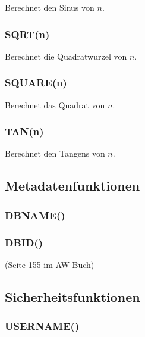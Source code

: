 \documentclass[12pt,ngerman,a4paper,index=totoc,twoside]{scrartcl}
\begin{document}
Berechnet den Sinus von $n$.

\subsubsection{SQRT(n)}

Berechnet die Quadratwurzel von $n$.

\subsubsection{SQUARE(n)}

Berechnet das Quadrat von $n$.

\subsubsection{TAN(n)}

Berechnet den Tangens von $n$.




\subsection{Metadatenfunktionen}

\subsubsection{DB\textunderscore NAME()} 

\subsubsection{DB\textunderscore ID()} 

(Seite 155 im AW Buch)

\subsection{Sicherheitsfunktionen}

\subsubsection{USER\textunderscore NAME()} 
\end{document}
